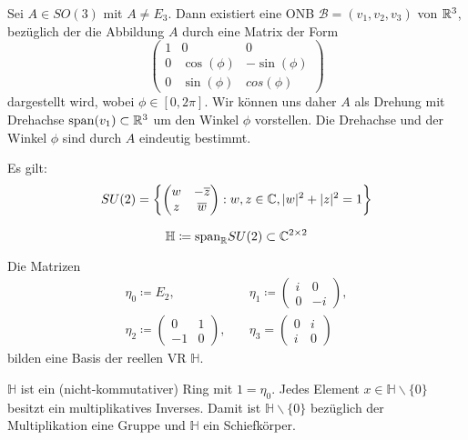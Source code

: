\documentclass{cheat-sheet}
\newcommand{\HH}{\mathbb{H}}
\newcommand{\BB}{\mathcal{B}}
\begin{document}
\begin{satz}
Sei $A \in SO(3)$ mit $A \not= E_3$. Dann existiert eine ONB $\BB = (v_1, v_2, v_3)$ von $\mathbb{R}^3$, bezüglich der die Abbildung $A$ durch eine Matrix der Form
\[ \begin{pmatrix}
1 & 0 & 0 \\
0 & \cos(\phi) & - \sin(\phi) \\
0 & \sin(\phi) & cos(\phi)
\end{pmatrix} \]
dargestellt wird, wobei $\phi \in [0, 2 \pi]$. Wir können uns daher $A$ als Drehung mit Drehachse $\mathrm{span}(v_1) \subset \mathbb{R}^3$ um den Winkel $\phi$ vorstellen. Die Drehachse und der Winkel $\phi$ sind durch $A$ eindeutig bestimmt.
\end{satz}


\begin{satz}
Es gilt:
\[ SU(2) = \left\{ \begin{pmatrix}
w & - \overline{z} \\
z & \overline{w}
\end{pmatrix} : w, z \in \mathbb{C}, |w|^2 + |z|^2 = 1 \right\} \]
\end{satz}

\begin{defn}
\[ \HH \coloneqq \mathrm{span}_{\R} SU(2) \subset \C^{2 \times 2} \]
\end{defn}

\begin{satz}
Die Matrizen
\begin{align*}
\eta_0 \coloneqq E_2, \quad & \eta_1 \coloneqq \begin{pmatrix} i & 0 \\ 0 & -i \end{pmatrix}, \\
\eta_2 \coloneqq \begin{pmatrix} 0 & 1 \\ -1 & 0 \end{pmatrix}, \quad & \eta_3 = \begin{pmatrix} 0 & i \\ i & 0 \end{pmatrix}
\end{align*}
bilden eine Basis der reellen VR $\mathbb{H}$.
\end{satz}

\begin{satz}
$\HH$ ist ein (nicht-kommutativer) Ring mit $1 = \eta_0$. Jedes Element $x \in \HH \backslash \{ 0 \}$ besitzt ein multiplikatives Inverses. Damit ist $\HH \backslash \{ 0 \}$ bezüglich der Multiplikation eine Gruppe und $\HH$ ein Schiefkörper.
\end{satz}
\end{document}
